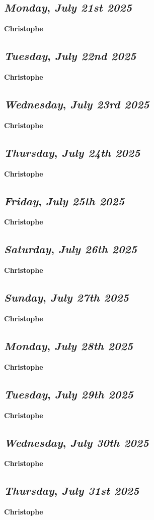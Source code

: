 \def\day{\textit{July 21st 2025}}
\def\weekday{\textit{Monday}}
\subsection*{\weekday, \day}
\textbf {Christophe}

\def\day{\textit{July 22nd 2025}}
\def\weekday{\textit{Tuesday}}
\subsection*{\weekday, \day}
\textbf {Christophe}

\def\day{\textit{July 23rd 2025}}
\def\weekday{\textit{Wednesday}}
\subsection*{\weekday, \day}
\textbf {Christophe}

\def\day{\textit{July 24th 2025}}
\def\weekday{\textit{Thursday}}
\subsection*{\weekday, \day}
\textbf {Christophe}

\def\day{\textit{July 25th 2025}}
\def\weekday{\textit{Friday}}
\subsection*{\weekday, \day}
\textbf {Christophe}

\def\day{\textit{July 26th 2025}}
\def\weekday{\textit{Saturday}}
\subsection*{\weekday, \day}
\textbf {Christophe}

\def\day{\textit{July 27th 2025}}
\def\weekday{\textit{Sunday}}
\subsection*{\weekday, \day}
\textbf {Christophe}

\def\day{\textit{July 28th 2025}}
\def\weekday{\textit{Monday}}
\subsection*{\weekday, \day}
\textbf {Christophe}

\def\day{\textit{July 29th 2025}}
\def\weekday{\textit{Tuesday}}
\subsection*{\weekday, \day}
\textbf {Christophe}

\def\day{\textit{July 30th 2025}}
\def\weekday{\textit{Wednesday}}
\subsection*{\weekday, \day}
\textbf {Christophe}

\def\day{\textit{July 31st 2025}}
\def\weekday{\textit{Thursday}}
\subsection*{\weekday, \day}
\textbf {Christophe}
